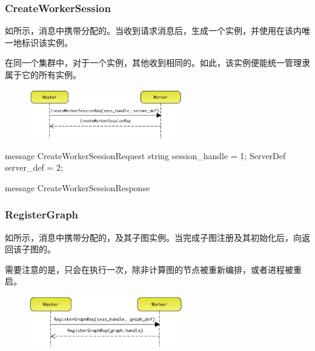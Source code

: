 \begin{content}
\begin{content}
\begin{content}
\subsubsection{CreateWorkerSession}

如所示，消息中携带分配的。当收到请求消息后，生成一个实例，并使用在该内唯一地标识该实例。

在同一个集群中，对于一个实例，其他收到相同的。如此，该实例便能统一管理隶属于它的所有实例。

\begin{figure}[H]
\centering
\includegraphics[width=0.6\textwidth]{figures/dist-worker-create-worker-sess.png}
\caption{}
 \label{fig:dist-worker-create-worker-sess}
\end{figure}

\begin{leftbar}
\begin{c++}
message CreateWorkerSessionRequest {
  string session_handle = 1;
  ServerDef server_def = 2;
}

message CreateWorkerSessionResponse {
}
\end{c++}
\end{leftbar}

\subsubsection{RegisterGraph}

如所示，消息中携带分配的，及其子图实例。当完成子图注册及其初始化后，向返回该子图的。

需要注意的是，只会在执行一次，除非计算图的节点被重新编排，或者进程被重启。

\begin{figure}[H]
\centering
\includegraphics[width=0.6\textwidth]{figures/dist-worker-register-graph.png}
\caption{}
 \label{fig:dist-worker-register-graph}
\end{figure}


\end{content}
\end{content}
\end{content}
